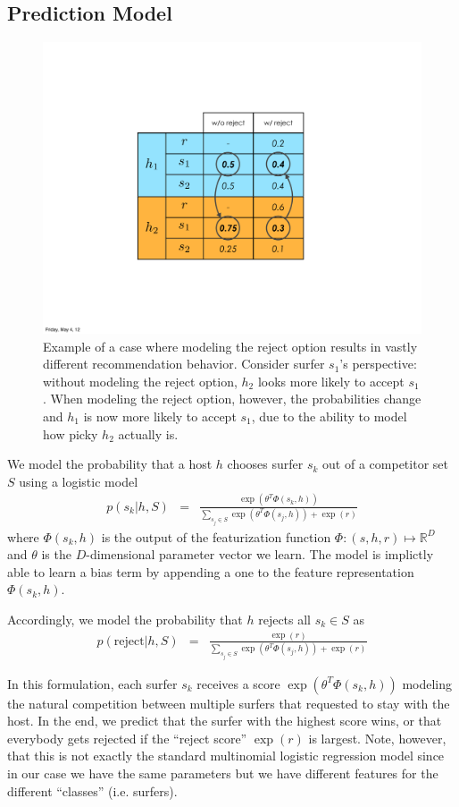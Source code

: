 \subsection{Prediction Model}
\begin{figure}[ht]
\centering
\includegraphics[width=0.6\linewidth]{figures/reject_vs_no_reject.pdf}
\caption{
Example of a case where modeling the reject option results in vastly different recommendation behavior.
Consider surfer $s_1$'s perspective: without modeling the reject option, $h_2$ looks more likely to accept $s_1$.
When modeling the reject option, however, the probabilities change and $h_1$ is now more likely to accept $s_1$, due to the ability to model how picky $h_2$ actually is.}
\label{fig:reject_vs_no_reject}
\end{figure}

We model the probability that a host $h$ chooses surfer $s_k$ out of a competitor set $S$ using a logistic model
\begin{eqnarray}
p(s_k | h, S) &=& \frac{\exp(\theta^T \Phi(s_k,h))}{\sum_{s_j \in S} \exp(\theta^T \Phi(s_j,h)) + \exp(r)}
\end{eqnarray}
where $\Phi(s_k,h)$ is the output of the featurization function $\Phi: (s,h,r)  \mapsto \mathbb{R}^D$ and $\theta$ is the $D$-dimensional parameter vector we learn.
The model is implictly able to learn a bias term by appending a one to the feature representation $\Phi(s_k,h)$.

Accordingly, we model the probability that $h$ rejects all $s_k \in S$ as
\begin{eqnarray}
p(\text{reject} | h, S) &=& \frac{\exp(r)}{\sum_{s_j \in S} \exp(\theta^T \Phi(s_j,h)) + \exp(r)}
\end{eqnarray}

In this formulation, each surfer $s_k$ receives a score $\exp(\theta^T \Phi(s_k,h))$ modeling the natural competition between multiple surfers that requested to stay with the host.
In the end, we predict that the surfer with the highest score wins, or that everybody gets rejected if the ``reject score'' $\exp{(r)}$ is largest. 
Note, however, that this is not exactly the standard multinomial logistic regression model since in our case we have the same parameters but we have different features for the different ``classes'' (i.e. surfers). 


